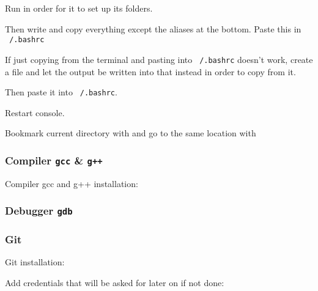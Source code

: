 Run  in order for it to set up its folders.

Then write  and copy everything except the aliases at the bottom. Paste this in \texttt{~/.bashrc}

If just copying from the terminal and pasting into \texttt{~/.bashrc} doesn't work, create a file and let the output be written into that instead in order to copy from it.



Then paste it into \texttt{~/.bashrc}.

Restart console.

Bookmark current directory with  and go to the same location with 

\subsubsection{Compiler \texttt{gcc} \& \texttt{g++}}
Compiler gcc and g++ installation:


\subsubsection{Debugger \texttt{gdb}}


\subsubsection{Git}
Git installation:


Add credentials that will be asked for later on if not done:

